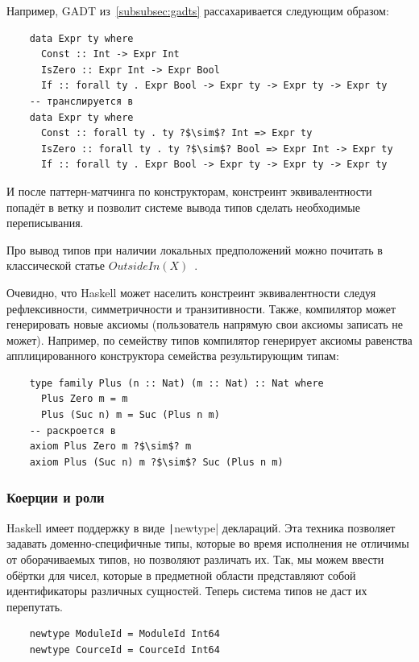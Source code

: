 Например, GADT из~\ref{subsubsec:gadts} рассахаривается следующим образом:
\begin{verbatim}
    data Expr ty where
      Const :: Int -> Expr Int
      IsZero :: Expr Int -> Expr Bool
      If :: forall ty . Expr Bool -> Expr ty -> Expr ty -> Expr ty
    -- транслируется в
    data Expr ty where
      Const :: forall ty . ty ?$\sim$? Int => Expr ty
      IsZero :: forall ty . ty ?$\sim$? Bool => Expr Int -> Expr ty
      If :: forall ty . Expr Bool -> Expr ty -> Expr ty -> Expr ty
\end{verbatim}
И после паттерн-матчинга по конструкторам, констреинт эквивалентности попадёт в ветку и позволит системе вывода типов сделать необходимые переписывания.

Про вывод типов при наличии локальных предположений можно почитать в классической статье $OutsideIn(X)$~\cite{vytiniotis2011outsidein}.

Очевидно, что Haskell может населить констреинт эквивалентности следуя рефлексивности, симметричности и транзитивности.
Также, компилятор может генерировать новые аксиомы (пользователь напрямую свои аксиомы записать не может).
Например, по семейству типов компилятор генерирует аксиомы равенства апплицированного конструктора семейства результирующим типам:
\begin{verbatim}
    type family Plus (n :: Nat) (m :: Nat) :: Nat where
      Plus Zero m = m
      Plus (Suc n) m = Suc (Plus n m)
    -- раскроется в
    axiom Plus Zero m ?$\sim$? m
    axiom Plus (Suc n) m ?$\sim$? Suc (Plus n m)
\end{verbatim}

\subsubsection{Коерции и роли} \label{subsubsec:coercions}

Haskell имеет поддержку  в виде \texttt|newtype| деклараций.
Эта техника позволяет задавать доменно-специфичные типы, которые во время исполнения не отличимы от оборачиваемых типов, но позволяют различать их.
Так, мы можем ввести обёртки для чисел, которые в предметной области представляют собой идентификаторы различных сущностей.
Теперь система типов не даст их перепутать.
\begin{verbatim}
    newtype ModuleId = ModuleId Int64
    newtype CourceId = CourceId Int64
\end{verbatim}

